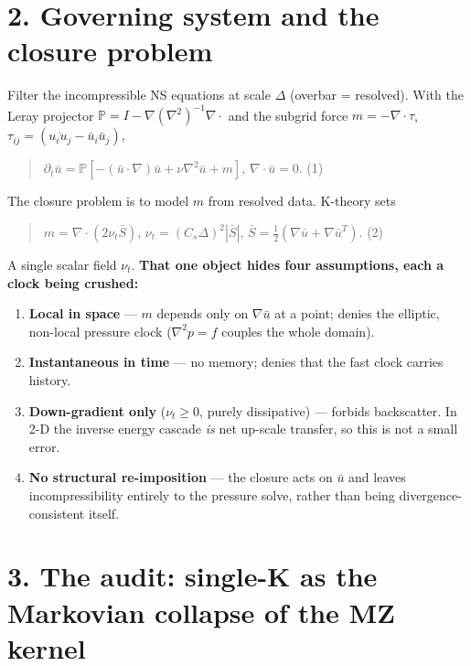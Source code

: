 \documentclass[aps,prfluids,preprint,superscriptaddress,nofootinbib]{revtex4-2}
\begin{document}
\section*{2. Governing system and the closure problem}

Filter the incompressible NS equations at scale $\Delta $ (overbar = resolved). With the Leray projector $\mathbb{P} = I - \nabla (\nabla ^{2})^{-1}\nabla \cdot $ and the subgrid force $m = -\nabla \cdot \tau $, $\tau _{ij} = (\overline{u_{i} u_{j}} - \bar{u}_{i} \bar{u}_{j})$,

\begin{quote}
$\partial _{t}\bar{u} = \mathbb{P}[ -(\bar{u}\cdot \nabla )\bar{u} + \nu \nabla ^{2}\bar{u} + m ]$, $\nabla \cdot \bar{u} = 0$. (1)
\end{quote}

The closure problem is to model $m$ from resolved data. K-theory sets

\begin{quote}
$m = \nabla \cdot (2 \nu _{t} \bar{S})$, $\nu _{t} = (C_{s} \Delta )^{2}|\bar{S}|$, $\bar{S} = \tfrac{1}{2}(\nabla \bar{u} + \nabla \bar{u}^{T})$. (2)
\end{quote}

A single scalar field $\nu _{t}$. \textbf{That one object hides four assumptions, each a clock being crushed:}

\begin{enumerate}
\item \textbf{Local in space} — $m$ depends only on $\nabla \bar{u}$ at a point; denies the elliptic, non-local pressure clock ($\nabla ^{2}p=f$ couples the whole domain).
\item \textbf{Instantaneous in time} — no memory; denies that the fast clock carries history.
\item \textbf{Down-gradient only} ($\nu _{t}\ge 0$, purely dissipative) — forbids backscatter. In 2-D the inverse energy cascade \emph{is} net up-scale transfer, so this is not a small error.
\item \textbf{No structural re-imposition} — the closure acts on $\bar{u}$ and leaves incompressibility entirely to the pressure solve, rather than being divergence-consistent itself.
\end{enumerate}

\section*{3. The audit: single-K as the Markovian collapse of the MZ kernel}
\end{document}

